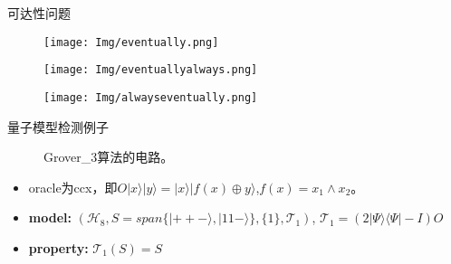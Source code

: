 \documentclass[aspectratio=1610]{ctexbeamer}
\begin{document}
\begin{frame}{可达性问题}
    \begin{figure}
        \texttt{[image: Img/eventually.png]}
    \end{figure}
    \begin{figure}
        \texttt{[image: Img/eventuallyalways.png]}
    \end{figure}
    \begin{figure}
        \texttt{[image: Img/alwayseventually.png]}
    \end{figure}
  \end{frame}

\begin{frame}{量子模型检测例子}
    \begin{figure}[h]
        \centering
        \caption{Grover\_3算法的电路。}
        \label{fig:cir}
    \end{figure}
    \begin{itemize}
        \item oracle为ccx，即$O|x\rangle|y\rangle = |x\rangle|f(x)\oplus y\rangle $,$f(x)=x_1\wedge x_2$。
        \item \textbf{model:} $(\mathcal{H}_8, S = span\{|++-\rangle,|11-\rangle\}, \{1\}, {\mathcal{T}_1})$, $\mathcal{T}_1 =(2|\Psi\rangle\langle \Psi| - I)O$ 
        \item \textbf{property:} $\mathcal{T}_1(S)=S$
    \end{itemize}
\end{frame}
\end{document}
